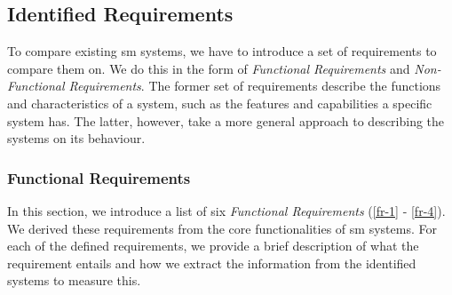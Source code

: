 \subsection{Identified Requirements}
\label{sec:survey:results:sm-requirements}

To compare existing \gls{sm} systems, we have to introduce a set of requirements to compare them on. We do this in the form of \textit{Functional Requirements} and \textit{Non-Functional Requirements}. The former set of requirements describe the functions and characteristics of a system, such as the features and capabilities a specific system has. The latter, however, take a more general approach to describing the systems on its behaviour.

\subsubsection{Functional Requirements}
\label{sec:survey:results:sm-requirements:fr}

In this section, we introduce a list of six \textit{Functional Requirements} (\ref{fr-1} - \ref{fr-4}). We derived these requirements from the core functionalities of \gls{sm} systems. For each of the defined requirements, we provide a brief description of what the requirement entails and how we extract the information from the identified systems to measure this.


